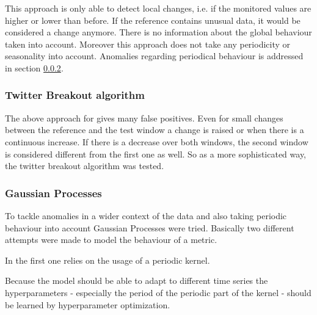 \documentclass[]{article}
\begin{document}




This approach is only able to detect local changes, i.e. if the monitored values are higher or lower than before.
If the reference contains unusual data, it would be considered a change anymore.
There is no information about the global behaviour taken into account.
Moreover this approach does not take any periodicity or seasonality into account.
Anomalies regarding periodical behaviour is addressed in section \ref{sec:gp}.

\subsubsection{Twitter Breakout algorithm}
The above approach for gives many false positives.
Even for small changes between the reference and the test window a change is raised or when there is a continuous increase.
If there is a decrease over both windows, the second window is considered different from the first one as well.
So as a more sophisticated way, the twitter breakout algorithm was tested.




\subsubsection{Gaussian Processes}
\label{sec:gp}

To tackle anomalies in a wider context of the data and also taking periodic behaviour into account Gaussian Processes were tried.
Basically two different attempts were made to model the behaviour of a metric.

In the first one relies on the usage of a periodic kernel.

Because the model should be able to adapt to different time series the hyperparameters - especially the period of the periodic part of the kernel - should be learned by hyperparameter optimization.
\end{document}
